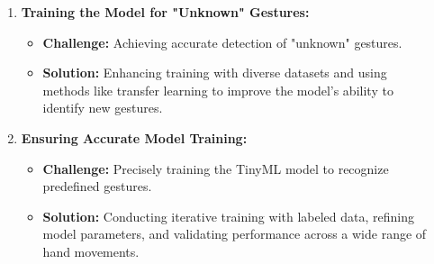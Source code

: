 \documentclass[25pt,a0paper, portrait]{tikzposter}
\begin{document}
\begin{columns}
{{\begin{enumerate}
\begin{itemize}
						\item \textbf{Solution:} Applying optimization techniques, such as model quantization, to minimize the model size while maintaining accuracy.
						
					\end{itemize}
					
					\item \textbf{Training the Model for "Unknown" Gestures:}
					
					\begin{itemize}
						
						\item \textbf{Challenge:} Achieving accurate detection of "unknown" gestures.
						
						\item \textbf{Solution:} Enhancing training with diverse datasets and using methods like transfer learning to improve the model's ability to identify new gestures.
						
					\end{itemize}
					
					\item \textbf{Ensuring Accurate Model Training:}
					
					\begin{itemize}
						
						\item \textbf{Challenge:} Precisely training the TinyML model to recognize predefined gestures.
						
						\item \textbf{Solution:} Conducting iterative training with labeled data, refining model parameters, and validating performance across a wide range of hand movements.
						
					\end{itemize}
					
				\end{enumerate}
			
			}

		{
			
			\begin{tikzfigure}
				

\end{tikzfigure}}}
\end{columns}
\end{document}
